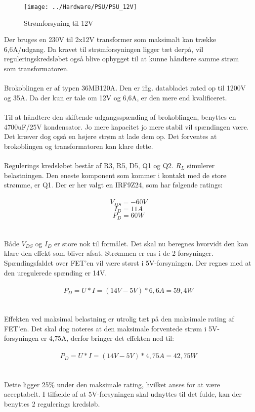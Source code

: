 \begin{figure}[H]
	\centering
	\texttt{[image: ../Hardware/PSU/PSU\_12V]}
	\caption{Strømforsyning til 12V}
	\label{photo:PSU_12V}
\end{figure}

Der bruges en 230V til 2x12V transformer som maksimalt kan trække 6,6A/udgang. Da kravet til strømforsyningen ligger tæt derpå, vil reguleringskredsløbet også blive opbygget til at kunne håndtere samme strøm som transformatoren.
\\\\
Brokoblingen er af typen 36MB120A. Den er iflg. databladet rated op til 1200V og 35A. Da der kun er tale om 12V og 6,6A, er den mere end kvalificeret.
\\\\
Til at håndtere den skiftende udgangsspænding af brokoblingen, benyttes en 4700uF/25V kondensator. Jo mere kapacitet jo mere stabil vil spændingen være. Det kræver dog også en højere strøm at lade dem op. Det forventes at brokoblingen og transformatoren kan klare dette.
\\\\
Regulerings kredsløbet består af R3, R5, D5, Q1 og Q2. $R_L$ simulerer belastningen. Den eneste komponent som kommer i kontakt med de store strømme, er Q1. Der er her valgt en IRF9Z24, som har følgende ratings:
\\\\
\begin{equation}
	V_{DS} = -60V
\end{equation}
\begin{equation}
	I_D = 11A
\end{equation}
\begin{equation}
	P_D = 60W
\end{equation}
\\\\
Både $V_{DS}$ og $I_D$ er store nok til formålet. Det skal nu beregnes hvorvidt den kan klare den effekt som bliver afsat. Strømmen er ens i de 2 forsyninger. Spændingsfaldet over FET'en vil være størst i 5V-forsyningen. Der regnes med at den uregulerede spænding er 14V.
\\\\
\begin{equation}
	P_D = U * I = (14V - 5V) * 6,6A = 59,4W
\end{equation}
\\\\
Effekten ved maksimal belastning er utrolig tæt på den maksimale rating af FET'en. Det skal dog noteres at den maksimale forventede strøm i 5V-forsyningen er 4,75A, derfor bringer det effekten ned til:
\\\\
\begin{equation}
	P_D = U * I = (14V - 5V) * 4,75A = 42,75W
\end{equation}
\\\\
Dette ligger 25\% under den maksimale rating, hvilket anses for at være acceptabelt. I tilfælde af at 5V-forsyningen skal udnyttes til det fulde, kan der benyttes 2 regulerings kredsløb.

